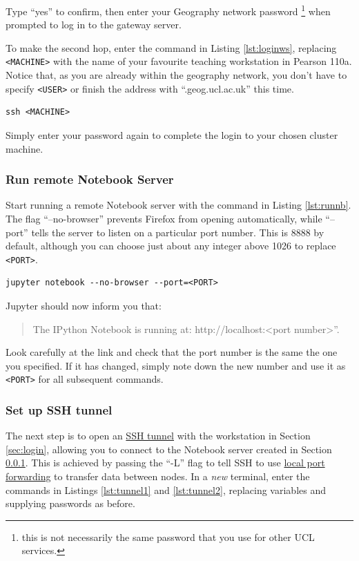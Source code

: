 \documentclass[a4paper]{article}
\begin{document}
Type ``yes'' to confirm, then enter your Geography network password \footnote{this is not necessarily the same password that you use for other UCL services.} when prompted to log in to the gateway server.

To make the second hop, enter the command in Listing \ref{lst:loginws}, replacing \texttt{\textless{}MACHINE\textgreater{}} with the name of your favourite teaching workstation in Pearson 110a. Notice that, as you are already within the geography network, you don't have to specify \texttt{\textless{}USER\textgreater{}} or finish the address with ``.geog.ucl.ac.uk'' this time.

\begin{lstlisting}[caption={Login to workstation}, label={lst:loginws}]
ssh <MACHINE>
\end{lstlisting}

Simply enter your password again to complete the login to your chosen cluster machine.

\subsubsection{Run remote Notebook Server}
\label{sec:runnb}

Start running a remote Notebook server with the command in Listing \ref{lst:runnb}.
The flag ``--no-browser'' prevents Firefox from opening automatically, while ``--port'' tells the server to listen on a particular port number.
This is 8888 by default, although you can choose just about any integer above 1026 to replace \texttt{\textless{}PORT\textgreater{}}.

\begin{lstlisting}[caption={Run Notebook server}, label={lst:runnb}]
jupyter notebook --no-browser --port=<PORT>
\end{lstlisting}

Jupyter should now inform you that:
\begin{quote}
The IPython Notebook is running at: http://localhost:\textless{}port number\textgreater{}''.
\end{quote}
Look carefully at the link and check that the port number is the same the one you specified.
If it has changed, simply note down the new number and use it as \texttt{\textless{}PORT\textgreater{}} for all subsequent commands.

\subsubsection{Set up SSH tunnel}
\label{sec:tunnel}
The next step is to open an \href{http://blog.trackets.com/2014/05/17/ssh-tunnel-local-and-remote-port-forwarding-explained-with-examples.html}{SSH tunnel} with the workstation in Section \ref{sec:login}, allowing you to connect to the Notebook server created in Section \ref{sec:runnb}.
This is achieved by passing the ``-L'' flag to tell SSH to use \href{https://help.ubuntu.com/community/SSH/OpenSSH/PortForwarding}{local port forwarding} to transfer data between nodes. 
In a \emph{new} terminal, enter the commands in Listings \ref{lst:tunnel1} and \ref{lst:tunnel2}, replacing variables and supplying passwords as before.
\end{document}
